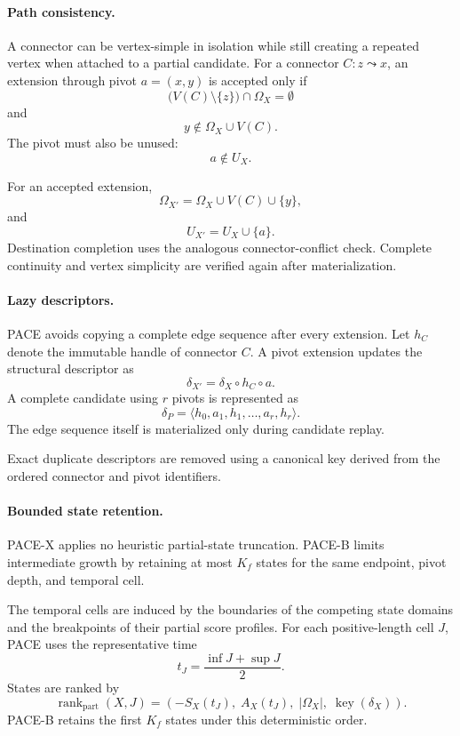 \documentclass[a4paper,fleqn]{cas-dc}
\begin{document}
\paragraph{Path consistency.}
A connector can be vertex-simple in isolation while still creating a repeated
vertex when attached to a partial candidate. For a connector
\(C:z\leadsto x\), an extension through pivot \(a=(x,y)\) is accepted only if
\[
\bigl(V(C)\setminus\{z\}\bigr)\cap\Omega_X=\emptyset
\]
and
\[
y\notin\Omega_X\cup V(C).
\]
The pivot must also be unused:
\[
a\notin U_X.
\]

For an accepted extension,
\[
\Omega_{X'}
=
\Omega_X\cup V(C)\cup\{y\},
\]
and
\[
U_{X'}
=
U_X\cup\{a\}.
\]
Destination completion uses the analogous connector-conflict check. Complete
continuity and vertex simplicity are verified again after materialization.

\paragraph{Lazy descriptors.}
PACE avoids copying a complete edge sequence after every extension. Let
\(h_C\) denote the immutable handle of connector \(C\). A pivot extension
updates the structural descriptor as
\[
\delta_{X'}
=
\delta_X\circ h_C\circ a.
\]
A complete candidate using \(r\) pivots is represented as
\[
\delta_P
=
\langle
h_0,a_1,h_1,\ldots,a_r,h_r
\rangle.
\]
The edge sequence itself is materialized only during candidate replay.

Exact duplicate descriptors are removed using a canonical key derived from the
ordered connector and pivot identifiers.

\paragraph{Bounded state retention.}
PACE-X applies no heuristic partial-state truncation. PACE-B limits
intermediate growth by retaining at most \(K_f\) states for the same endpoint,
pivot depth, and temporal cell.

The temporal cells are induced by the boundaries of the competing state
domains and the breakpoints of their partial score profiles. For each
positive-length cell \(J\), PACE uses the representative time
\[
t_J
=
\frac{\inf J+\sup J}{2}.
\]
States are ranked by
\[
\operatorname{rank}_{\mathrm{part}}(X,J)
=
\left(
-S_X(t_J),\;
A_X(t_J),\;
|\Omega_X|,\;
\operatorname{key}(\delta_X)
\right).
\]
PACE-B retains the first \(K_f\) states under this deterministic order.
\end{document}
